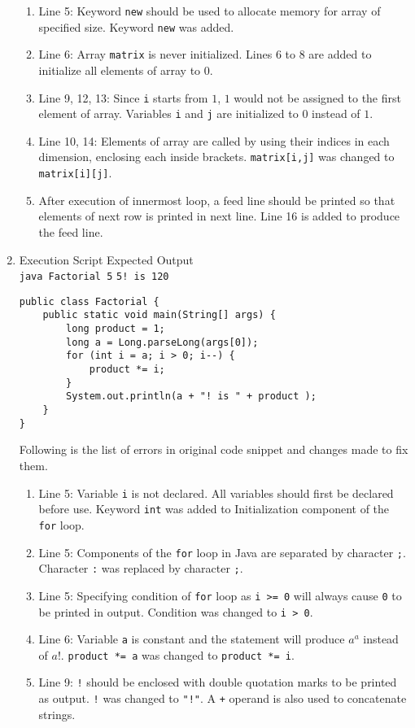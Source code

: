 \documentclass[12pt,letterpaper,twoside]{article}
\begin{document}
\begin{enumerate}[label=\textbf{(\alph*)}]
\begin{enumerate}[label=\arabic*.]
\item Line 5: Keyword \texttt{new} should be used to allocate memory for array of specified size. Keyword \texttt{new} was added.
\item Line 6: Array \texttt{matrix} is never initialized. Lines 6 to 8 are added to initialize all elements of array to 0.
\item Line 9, 12, 13: Since \texttt{i} starts from $1$, $1$ would not be assigned to the first element of array. Variables \texttt{i} and \texttt{j} are initialized to $0$ instead of $1$.
\item Line 10, 14: Elements of array are called by using their indices in each dimension, enclosing each inside brackets. \texttt{matrix[i,j]} was changed to \texttt{matrix[i][j]}.
\item After execution of innermost loop, a feed line should be printed so that elements of next row is printed in next line. Line 16 is added to produce the feed line.
\end{enumerate}

\item Execution Script \hfill Expected Output\\
\texttt{java Factorial 5} \hfill \texttt{5! is 120}

\begin{lstlisting}
public class Factorial {
	public static void main(String[] args) {
		long product = 1;
		long a = Long.parseLong(args[0]);
		for (int i = a; i > 0; i--) {
			product *= i;
		}
		System.out.println(a + "! is " + product );
	}
}
\end{lstlisting}

Following is the list of errors in original code snippet and changes made to fix them.

\begin{enumerate}[label=\arabic*.]
\item Line 5: Variable \texttt{i} is not declared. All variables should first be declared before use. Keyword \texttt{int} was added to Initialization component of the \texttt{for} loop.
\item Line 5: Components of the \texttt{for} loop in Java are separated by character \texttt{;}. Character \texttt{:} was replaced by character \texttt{;}.
\item Line 5: Specifying condition of \texttt{for} loop as \texttt{i >= 0} will always cause \texttt{0} to be printed in output. Condition was changed to \texttt{i > 0}.
\item Line 6: Variable \texttt{a} is constant and the statement will produce $a^a$ instead of $a!$. \texttt{product *= a} was changed to \texttt{product *= i}.
\item Line 9: \texttt{!} should be enclosed with double quotation marks to be printed as output. \texttt{!} was changed to \texttt{"!"}. A \texttt{+} operand is also used to concatenate strings.
\end{enumerate}

\end{enumerate}
\end{document}

